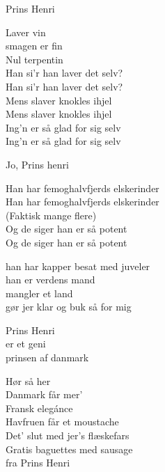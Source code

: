 \begin{song}{Prins Henri}
\begin{SBVerse}
  Laver vin \\
smagen er fin \\
Nul terpentin \\
Han si’r han laver det selv? \\
Han si’r han laver det selv? \\
Mens slaver knokles ihjel \\
Mens slaver knokles ihjel \\
Ing’n er så glad for sig selv \\
Ing’n er så glad for sig selv \\
\end{SBVerse}

\begin{SBVerse}
  Jo, Prins henri \\
\end{SBVerse}

\begin{SBVerse}
  Han har femoghalvfjerds elskerinder \\
  Han har femoghalvfjerds elskerinder \\
  (Faktisk mange flere) \\
  Og de siger han er så potent \\
  Og de siger han er så potent \\
\end{SBVerse}

\begin{SBVerse}
  han har kapper besat med juveler \\
  han er verdens mand \\
  mangler et land \\
  gør jer klar og buk så for mig \\
\end{SBVerse}

\begin{SBVerse}
  Prins Henri \\
er et geni \\
prinsen af danmark \\
\end{SBVerse}


\begin{SBVerse}
  Hør så her \\
  Danmark får mer’ \\
  Fransk elegánce \\
  Havfruen får et moustache \\
  Det’ slut med jer’s flæskefars \\
  Gratis baguettes med sausage \\
  fra Prins Henri \\
\end{SBVerse}


\end{song}
